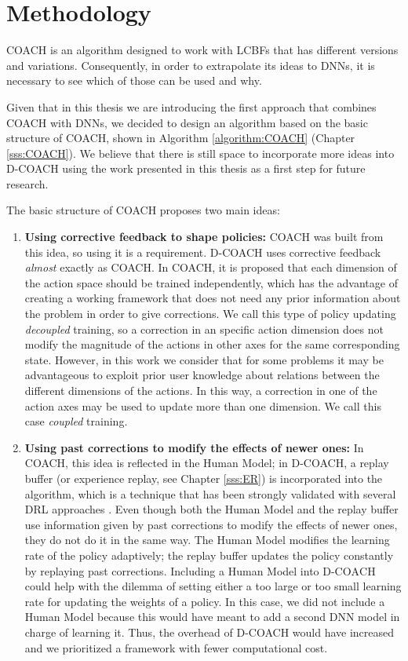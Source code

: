 \section{Methodology}
COACH is an algorithm designed to work with LCBFs that has different versions and variations. Consequently, in order to extrapolate its ideas to DNNs, it is necessary to see which of those can be used and why.

Given that in this thesis we are introducing the first approach that combines COACH with DNNs, we decided to design an algorithm based on the basic structure of COACH, shown in Algorithm \ref{algorithm:COACH} (Chapter \ref{sss:COACH}). We believe that there is still space to incorporate more ideas into D-COACH using the work presented in this thesis as a first step for future research.

The basic structure of COACH proposes two main ideas:

\begin{enumerate}
    \item \textbf{Using corrective feedback to shape policies:} COACH was built from this idea, so using it is a requirement. D-COACH uses corrective feedback \emph{almost} exactly as COACH. In COACH, it is proposed that each dimension of the action space should be trained independently, which has the advantage of creating a working framework that does not need any prior information about the problem in order to give corrections. We call this type of policy updating \emph{decoupled} training, so a correction in an specific action dimension does not modify the magnitude of the actions in other axes for the same corresponding state. However, in this work we consider that for some problems it may be advantageous to exploit prior user knowledge about relations between the different dimensions of the actions. In this way, a correction in one of the action axes may be used to update more than one dimension. We call this case \emph{coupled} training.
    
    \item \textbf{Using past corrections to modify the effects of newer ones:} In COACH, this idea is reflected in the Human Model; in D-COACH, a replay buffer (or experience replay, see Chapter \ref{sss:ER}) is incorporated into the algorithm, which is a technique that has been strongly validated with several DRL approaches \cite{atari, haarnoja2018soft, Lillicrap2015}. Even though both the Human Model and the replay buffer use information given by past corrections to modify the effects of newer ones, they do not do it in the same way. The Human Model modifies the learning rate of the policy adaptively; the replay buffer updates the policy constantly by replaying past corrections. Including a Human Model into $\text{D-COACH}$ could help with the dilemma of setting either a too large or too small learning rate for updating the weights of a policy. In this case, we did not include a Human Model because this would have meant to add a second DNN model in charge of learning it. Thus, the overhead of D-COACH would have increased and we prioritized a framework with fewer computational cost.
\end{enumerate}


